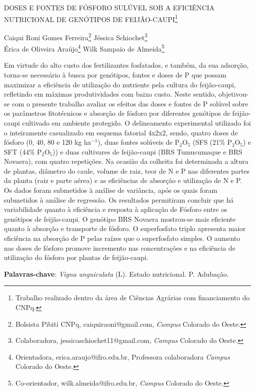 \documentclass[article,12pt,onesidea,4paper,english,brazil]{abntex2}
\begin{document}
	
	
	\frenchspacing 
	
	\begin{center}
		\LARGE DOSES E FONTES DE FÓSFORO SULÚVEL SOB A EFICIÊNCIA NUTRICIONAL
		DE GENÓTIPOS DE FEIJÃO-CAUPI\footnote{Trabalho realizado dentro da área de Ciências Agrárias com financiamento do CNPq.}
		
		\normalsize
		Caiqui Roni Gomes Ferreira\footnote{Bolsista Pibiti CNPq, caiquiraoni@gmail.com, \textit{Campus} Colorado do Oeste.} 
		Jéssica Schiochet\footnote{Colaboradora, jessicaschiochet11@gmail.com, \textit{Campus} Colorado do Oeste.} \\
		Érica de Oliveira Araújo\footnote{Orientadora, erica.araujo@ifro.edu.br, Professora colaboradora \textit{Campus} Colorado do Oeste.} 
		Wilk Sampaio de Almeida\footnote{Co-orientador, wilk.almeida@ifro.edu.br, \textit{Campus} Colorado do Oeste.} 
	\end{center}
	
	\noindent Em virtude do alto custo dos fertilizantes fosfatados, e também, da sua adsorção,
	torna-se necessário à busca por genótipos, fontes e doses de P que possam
	maximizar a eficiência de utilização do nutriente pela cultura do feijão-caupi,
	refletindo em máximas produtividades com baixo custo. Neste sentido, objetivou-se
	com o presente trabalho avaliar os efeitos das doses e fontes de P solúvel sobre os
	parâmetros fitotécnicos e absorção de fósforo por diferentes genótipos de feijão-
	caupi cultivado em ambiente protegido. O delineamento experimental utilizado foi o
	inteiramente casualizado em esquema fatorial 4x2x2, sendo, quatro doses de fósforo
	(0, 40, 80 e 120 kg ha$^{-1}$), duas fontes solúveis de P$_2$O$_5$ (SFS (21\% P$_2$O$_5$) e SFT (44\% P$_2$O$_5$)) e duas cultivares de feijão-caupi (BRS Tumucumaque e BRS Novaera), com
	quatro repetições. Na ocasião da colheita foi determinada a altura de plantas,
	diâmetro do caule, volume de raiz, teor de N e P nas diferentes partes da planta (raiz
	e parte aérea) e as eficiências de absorção e utilização de N e P. Os dados foram
	submetidos à análise de variância, após os quais foram submetidos à análise de
	regressão. Os resultados permitiram concluir que há variabilidade quanto à eficiência
	e resposta à aplicação de Fósforo entre os genótipos de feijão-caupi. O genótipo
	BRS Novaera mostrou-se mais eficiente quanto à absorção e transporte de fósforo.
	O superfosfato triplo apresenta maior eficiência na absorção de P pelas raízes que o
	superfosfato simples. O aumento nas doses de fósforo promove incremento nas
	concentrações e na eficiência de utilização do fósforo por plantas de feijão-caupi.
	
	\vspace{\onelineskip}
	
	\noindent
	\textbf{Palavras-chave}: \textit{Vigna unguiculata} (L). Estado nutricional. P. Adubação.
	
\end{document}
